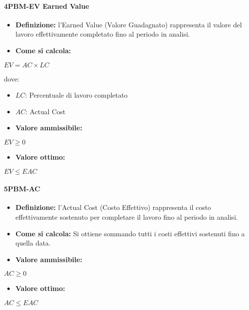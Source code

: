\paragraph*{4PBM-EV Earned Value}
\begin{itemize}
    \item \textbf{Definizione:} l’Earned Value (Valore Guadagnato) rappresenta il valore del lavoro effettivamente completato fino al periodo in analisi.
    \item \textbf{Come si calcola:}
\end{itemize}
\begin{center}
   $EV = AC \times LC$ 
\end{center}
dove:
\begin{itemize}[label=$\rightarrow$]
    \item $LC$: Percentuale di lavoro completato
    \item $AC$: Actual Cost
\end{itemize}
\begin{itemize}
    \item \textbf{Valore ammissibile:}
\end{itemize}
\begin{center}
    $EV \geq 0$
\end{center}
\begin{itemize}
    \item \textbf{Valore ottimo:}
\end{itemize}
\begin{center}
    $EV \leq EAC$
\end{center}

\paragraph*{5PBM-AC}
\begin{itemize}
    \item \textbf{Definizione:} l’Actual Cost (Costo Effettivo) rappresenta il costo effettivamente sostenuto per completare il lavoro fino al periodo in analisi.
    \item \textbf{Come si calcola:} Si ottiene sommando tutti i costi effettivi sostenuti fino a quella data.
\end{itemize}
\begin{itemize}
    \item \textbf{Valore ammissibile:}
\end{itemize}
\begin{center}
    $AC \geq 0$
\end{center}
\begin{itemize}
    \item \textbf{Valore ottimo:}
\end{itemize}
\begin{center}
    $AC \leq EAC$
\end{center}

